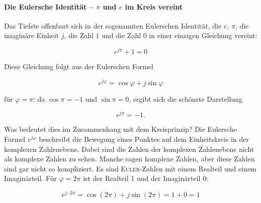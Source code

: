 ﻿\documentclass[a4paper,12pt]{article}
\theoremstyle{definition}
\begin{document}
\paragraph{Die Eulersche Identität -- $\pi$ und $e$ im Kreis vereint}

Das Tiefste offenbart sich in der sogenannten Eulerschen Identität, die $e$,
$\pi$, die imaginäre Einheit $j$, die Zahl $1$ und die Zahl $0$ in einer einzigen
Gleichung vereint:

\begin{equation}
	e^{j\pi} + 1 = 0
\end{equation}

Diese Gleichung folgt aus der Eulerschen Formel

\begin{equation}
	e^{j\varphi} = \cos\varphi + j\sin\varphi
\end{equation}

für $\varphi = \pi$: da $\cos\pi = -1$ und $\sin\pi = 0$, ergibt sich die schönste Darstellung

\begin{equation}
	e^{j\pi} = -1.
\end{equation}
	
Was bedeutet dies im Zusammenhang mit dem Kreisprinzip? Die Eulersche Formel
$e^{j\varphi}$ beschreibt die Bewegung eines Punktes auf dem Einheitskreis in
der komplexen Zahlenebene. Dabei sind die Zahlen der komplexen Zahlenebene nicht als komplexe Zahlen zu sehen. Manche sagen komplexe Zahlen, aber diese Zahlen sind gar nicht so kompliziert. Es sind \textsc{Euler}-Zahlen mit einem Realteil und einem Imaginärteil. Für $\varphi = 2\pi$ ist der Realteil 1 und der Imaginärteil 0:

\begin{equation}
	e^{j \cdot 2\pi} = \cos(2\pi) + j\sin(2\pi) = 1 + 0 = 1
\end{equation}
\end{document}
